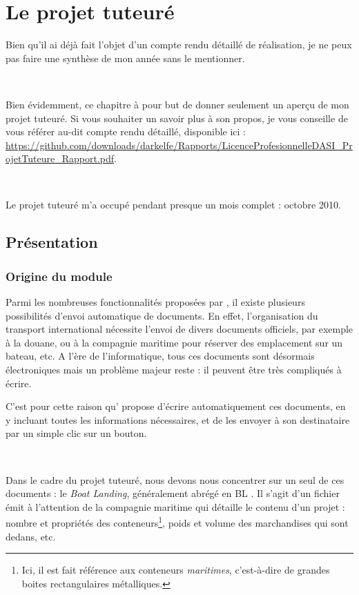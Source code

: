 \chapter{Le projet tuteuré}
Bien qu'il ai déjà fait l'objet d'un compte rendu détaillé de réalisation, je ne peux pas faire une synthèse de mon année sans le mentionner.

~

Bien évidemment, ce chapitre à pour but de donner seulement un aperçu de mon projet tuteuré. Si vous souhaiter un savoir plus à son propos, je vous conseille de vous référer au-dit compte rendu détaillé, disponible ici : \url{https://github.com/downloads/darkelfe/Rapports/LicenceProfesionnelleDASI_ProjetTuteure_Rapport.pdf}.

~

Le projet tuteuré m'a occupé pendant presque un mois complet : octobre 2010.

\section{Présentation}
\subsection{Origine du module}
Parmi les nombreuses fonctionnalités proposées par \integrale, il existe plusieurs possibilités d'envoi automatique de documents. En effet, l'organisation du transport international nécessite l'envoi de divers documents officiels, par exemple à la douane, ou à la compagnie maritime pour réserver des emplacement sur un bateau, etc. A l'ère de l'informatique, tous ces documents sont désormais électroniques mais un problème majeur reste : il peuvent être très compliqués à écrire.

C'est pour cette raison qu'\integrale{} propose d'écrire automatiquement ces documents, en y incluant toutes les informations nécessaires, et de les envoyer à son destinataire par un simple clic sur un bouton.

~

Dans le cadre du projet tuteuré, nous devons nous concentrer sur un seul de ces documents : le \emph{Boat Landing}, généralement abrégé en
\og BL \fg. Il s'agit d'un fichier émit à l'attention de la compagnie maritime qui détaille le contenu d'un projet : nombre et propriétés des conteneurs\footnote{Ici, il est fait référence aux conteneurs \emph{maritimes}, c'est-à-dire de grandes boites rectangulaires métalliques.}, poids et volume des marchandises qui sont dedans, etc.

